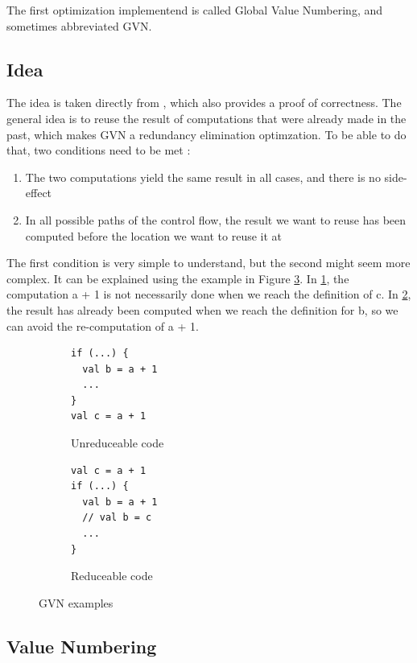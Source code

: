 \documentclass[11pt,a4paper]{article}
\newcommand{\scala}[1]{\textsf{#1}}
\begin{document}
The first optimization implementend is called Global Value Numbering, and sometimes abbreviated GVN.

\subsection{Idea}

The idea is taken directly from \cite{ssabook}, which also provides a proof of correctness. The general idea is to reuse the result of computations that were already made in the past, which makes GVN a redundancy elimination optimzation. To be able to do that, two conditions need to be met :

\begin{enumerate}
\item The two computations yield the same result in all cases, and there is no side-effect
\item In all possible paths of the control flow, the result we want to reuse has been computed before the location we want to reuse it at
\end{enumerate}

The first condition is very simple to understand, but the second might seem more complex. It can be explained using the example in Figure \ref{fig:gvn}. In \ref{fig:gvn1}, the computation \scala{a + 1} is not necessarily done when we reach the definition of \scala{c}. In \ref{fig:gvn2}, the result has already been computed when we reach the definition for \scala{b}, so we can avoid the re-computation of \scala{a + 1}.

\begin{figure}[h]
	\begin{subfigure}{0.5\textwidth}
		\begin{lstlisting}
if (...) {
  val b = a + 1
  ...
}
val c = a + 1
		\end{lstlisting}
		\caption{Unreduceable code}
		\label{fig:gvn1}
	\end{subfigure}
	\quad
	\begin{subfigure}{0.5\textwidth}
		\begin{lstlisting}
val c = a + 1
if (...) {
  val b = a + 1
  // val b = c
  ...
}
		\end{lstlisting}
		\caption{Reduceable code}
		\label{fig:gvn2}
	\end{subfigure}
	\caption{GVN examples}
	\label{fig:gvn}
\end{figure}

\subsection{Value Numbering}
\end{document}
